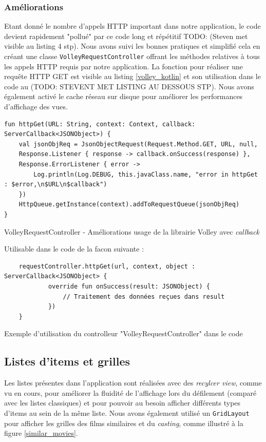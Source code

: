 \subsubsection{Améliorations}
Etant donné le nombre d'appels HTTP important dans notre application, le code devient rapidement "pollué" par ce code long et répétitif TODO: (Steven met visible au listing 4 stp). Nous avons suivi les bonnes pratiques et simplifié cela en créant une classe \texttt{VolleyRequestController} offrant les méthodes relatives à tous les appels HTTP requis par notre application. La fonction pour réaliser une requête HTTP GET est visible au listing \ref{volley_kotlin} et son utilisation dans le code au (TODO: STEVENT MET LISTING AU DESSOUS STP). Nous avons également activé le cache réseau sur disque pour améliorer les performances d'affichage des vues.
\bigbreak
\begin{code}
    \begin{verbatim}
fun httpGet(URL: String, context: Context, callback: ServerCallback<JSONObject>) {
    val jsonObjReq = JsonObjectRequest(Request.Method.GET, URL, null,
    Response.Listener { response -> callback.onSuccess(response) },
    Response.ErrorListener { error ->
        Log.println(Log.DEBUG, this.javaClass.name, "error in httpGet : $error,\n$URL\n$callback")
    })
    HttpQueue.getInstance(context).addToRequestQueue(jsonObjReq)
}
    \end{verbatim}
    \caption{VolleyRequestController - Améliorations usage de la librairie Volley avec \textit{callback}}
    \label{volley_kotlin}
\end{code}
\bigbreak

Utilisable dans le code de la facon suivante : 

\bigbreak
\begin{code}
    \begin{verbatim}
    requestController.httpGet(url, context, object : ServerCallback<JSONObject> {
            override fun onSuccess(result: JSONObject) {
                // Traitement des données reçues dans result
            })
    }
    \end{verbatim}
    \caption{Exemple d'utilisation du controlleur "VolleyRequestController" dans le code}
    \label{volley_kotlin}
\end{code}
\bigbreak

\subsection{Listes d'items et grilles}
Les listes présentes dans l'application sont réalisées avec des \textit{recylcer view}, comme vu en cours, pour améliorer la fluidité de l'affichage lors du défilement (comparé avec les listes classiques) et pour pouvoir au besoin afficher différents types d'items au sein de la même liste. Nous avons également utilisé un \texttt{GridLayout} pour afficher les grilles des films similaires et du \textit{casting}, comme illustré à la figure \ref{similar_movies}.

